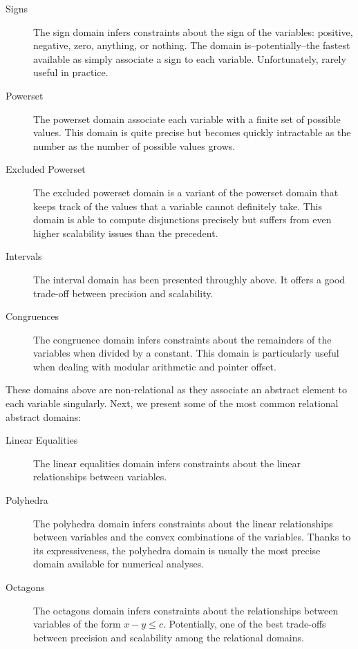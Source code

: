 \begin{description}
  \item[Signs \cite{Cousot1977}]  The sign domain infers constraints about the sign of the variables: positive, negative, zero, anything, or nothing. The domain is--potentially--the fastest available as simply associate a sign to each variable. Unfortunately, rarely useful in practice.
  \item[Powerset \cite{Min_e2017}]  The powerset domain associate each variable with a finite set of possible values. This domain is quite precise but becomes quickly intractable as the number as the number of possible values grows.
  \item[Excluded Powerset \cite{Monat2024}]  The excluded powerset domain is a variant of the powerset domain that keeps track of the values that a variable cannot definitely take. This domain is able to compute disjunctions precisely but suffers from even higher scalability issues than the precedent.
  \item[Intervals \cite{Cousot1976,Hickey2001}]  The interval domain has been presented throughly above. It offers a good trade-off between precision and scalability.
  \item[Congruences \cite{Granger1991}]  The congruence domain infers constraints about the remainders of the variables when divided by a constant. This domain is particularly useful when dealing with modular arithmetic and pointer offset.
\end{description}
These domains above are non-relational as they associate an abstract element to each variable singularly. Next, we present some of the most common relational abstract domains:
\begin{description}
  \item[Linear Equalities \cite{Karr1976}]  The linear equalities domain infers constraints about the linear relationships between variables.
  \item[Polyhedra \cite{Cousot1978}]  The polyhedra domain infers constraints about the linear relationships between variables and the convex combinations of the variables. Thanks to its expressiveness, the polyhedra domain is usually the most precise domain available for numerical analyses.
  \item[Octagons \cite{Min_e2006a}]  The octagons domain infers constraints about the relationships between variables of the form $x - y \le c$. Potentially, one of the best trade-offs between precision and scalability among the relational domains.
\end{description}

